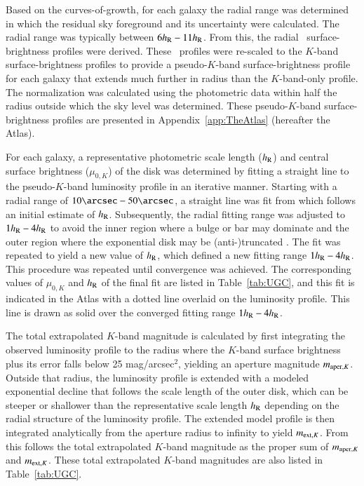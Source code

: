 \documentclass[traditabstract]{aa} %
\begin{document}
Based on the curves-of-growth, for each galaxy the radial range was determined in which
the residual sky foreground and its uncertainty were calculated. The radial range was
typically between $6h_{\rm R} - 11h_{\rm R}$. From this, the radial \jhk\ surface-brightness profiles
were derived. These \jhk\ profiles were re-scaled to the $K$-band surface-brightness 
profiles to provide a pseudo-$K$-band surface-brightness profile for each galaxy that
extends much further in radius than the $K$-band-only profile. The normalization was 
calculated using the photometric data within half the radius outside which the sky level
was determined. These pseudo-$K$-band surface-brightness profiles are presented in
Appendix~\ref{app:TheAtlas} (hereafter the Atlas).

For each galaxy, a representative photometric scale length ($h_{\rm R}$) and central
surface brightness ($\mu_{0,K}$) of the disk was determined by fitting a
straight line to the pseudo-$K$-band luminosity profile in an iterative manner.
Starting with a radial range of $10\arcsec - 50\arcsec$, a straight line was fit
from which follows an initial estimate of $h_{\rm R}$. Subsequently, the radial
fitting range was adjusted to $1h_{\rm R}-4h_{\rm R}$ to avoid the inner region where a
bulge or bar may dominate \citep{kormendy2004, erwin2005} and the outer region
where the exponential disk may be (anti-)truncated \citep{kregel2004,
pohlen2006}.  The fit was repeated to yield a new value of $h_{\rm R}$, which defined
a new fitting range $1h_{\rm R}-4h_{\rm R}$.  This procedure was repeated until convergence
was achieved.  The corresponding values of $\mu_{0,K}$ and $h_{\rm R}$ of the final
fit are listed in Table~\ref{tab:UGC}, and this fit is indicated in the Atlas
with a dotted line overlaid on the luminosity profile. This line is drawn as 
solid over the converged fitting range $1h_{\rm R}-4h_{\rm R}$.

The total extrapolated $K$-band magnitude is calculated by first integrating the
observed luminosity profile to the radius where the $K$-band surface brightness
plus its error falls below 25 mag/arcsec$^2$, yielding an aperture magnitude
$m_{{\rm aper},K}$.  Outside that radius, the luminosity profile is extended
with a modeled exponential decline that follows the scale length of the outer
disk, which can be steeper or shallower than the representative scale length
$h_{\rm R}$ depending on the radial structure of the luminosity profile.  The extended
model profile is then integrated analytically from the aperture radius to
infinity to yield $m_{{\rm ext},K}$.  From this follows the total extrapolated
$K$-band magnitude as the proper sum of $m_{{\rm aper},K}$ and $m_{{\rm
ext},K}$.  These total extrapolated $K$-band magnitudes are also listed in
Table~\ref{tab:UGC}.
\end{document}
